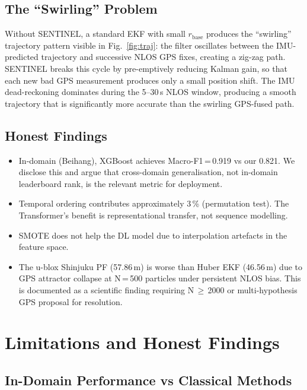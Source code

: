 \documentclass[12pt,a4paper]{article}
\begin{document}
\subsection{The ``Swirling'' Problem}

Without SENTINEL, a standard EKF with small $r_\mathrm{base}$ produces the ``swirling''
trajectory pattern visible in Fig.~\ref{fig:traj}: the filter oscillates between the
IMU-predicted trajectory and successive NLOS GPS fixes, creating a zig-zag path.
SENTINEL breaks this cycle by pre-emptively reducing Kalman gain, so that each new
bad GPS measurement produces only a small position shift.
The IMU dead-reckoning dominates during the 5--30\,s NLOS window, producing a
smooth trajectory that is significantly more accurate than the swirling GPS-fused path.

\subsection{Honest Findings}

\begin{itemize}
  \item In-domain (Beihang), XGBoost achieves Macro-F1\,=\,0.919 vs our 0.821.
    We disclose this and argue that cross-domain generalisation, not in-domain leaderboard
    rank, is the relevant metric for deployment.
  \item Temporal ordering contributes approximately 3\,\% (permutation test).
    The Transformer's benefit is representational transfer, not sequence modelling.
  \item SMOTE does not help the DL model due to interpolation artefacts in the
    feature space.
  \item The u-blox Shinjuku PF (57.86\,m) is worse than Huber EKF (46.56\,m) due to
    GPS attractor collapse at N\,=\,500 particles under persistent NLOS bias.
    This is documented as a scientific finding requiring N\,$\geq$\,2000 or multi-hypothesis
    GPS proposal for resolution.
\end{itemize}

\section{Limitations and Honest Findings}
\label{sec:limitations}

\subsection{In-Domain Performance vs Classical Methods}
\end{document}
